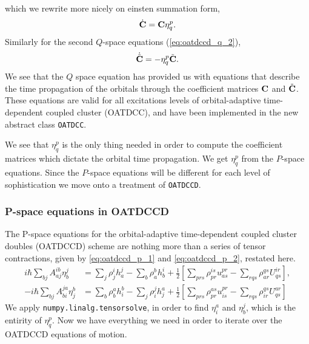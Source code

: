     which we rewrite more nicely on einsten summation form,
    \begin{equation}
        \dot{\vb{C}} = \vb{C}\eta^p_q.
    \end{equation}
    Similarly for the second $Q$-space equations (\autoref{eq:oatdccd_q_2}),
    \begin{equation}
       \dot{\tilde{\vb{C}}} = -\eta^p_q\tilde{\vb{C}}.
    \end{equation}
    We see that the $Q$ space equation has provided us with equations that 
    describe the time propagation of the orbitals through the coefficient 
    matrices $\vb{C}$ and $\tilde{\vb{C}}$. These equations are valid 
    for all excitations levels of orbital-adaptive time-dependent coupled cluster
    (OATDCC), and have been implemented 
    in the new abstract class \lstinline{OATDCC}.

    We see that $\eta^p_q$ is the only thing needed in order to compute the 
    coefficient matrices which dictate the orbital time propagation. We get $\eta^p_q$
    from the $P$-space equations. Since the $P$-space equations will be different for 
    each level of sophistication we move onto a treatment of \lstinline{OATDCCD}.

    \subsubsection{P-space equations in OATDCCD} 

    The P-space equations for the orbital-adaptive time-dependent coupled cluster 
    doubles (OATDCCD) scheme are nothing more than a series of tensor contractions,
    given by \autoref{eq:oatdccd_p_1} and \autoref{eq:oatdccd_p_2}, restated here.
    \begin{align*}
    i\hbar\sum_{bj}A^{ib}_{aj} \eta^j_b
        &= \sum_j \rho^i_j h^j_a - \sum_b \rho^b_a h^i_b
        + \frac{1}{2}\left[
             \sum_{prs}\rho^{is}_{pr} u^{pr}_{as}
            -\sum_{rqs}\rho^{qs}_{ar} U^{ir}_{qs}
        \right], \\
    -i\hbar\sum_{bj}A^{ja}_{bi} \eta^b_j
        &= \sum_b \rho^a_b h^b_i - \sum_j \rho^j_i h^a_j
        + \frac{1}{2}\left[
             \sum_{prs}\rho^{as}_{pr} u^{pr}_{is}
            -\sum_{rqs}\rho^{qs}_{ir} U^{ar}_{qs}       
        \right]
    \end{align*}
    We apply \lstinline{numpy.linalg.tensorsolve}, in order to find $\eta^a_i$ and 
    $\eta^j_b$, which is the entirity of $\eta^p_q$.
    Now we have everything we need in order to iterate over the OATDCCD equations of 
    motion.

